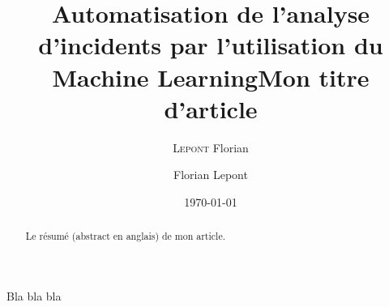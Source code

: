 \documentclass[a4paper,10pt]{report}
\title{Automatisation de l'analyse d'incidents par l'utilisation du Machine Learning}
\author{\textsc{Lepont} Florian}
\date{\today} %
\title{Mon titre d'article}
\date{}
\author{Florian Lepont}
\begin{document}
	
\maketitle

\begin{abstract}
Le résumé (abstract en anglais) de mon article.
\end{abstract}


\tableofcontents


Bla bla bla

\listoffigures
\listoftables
\printindex
\end{document}
